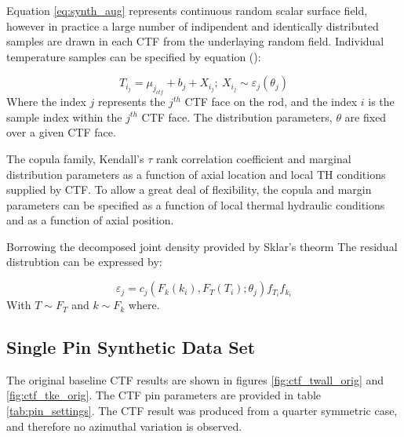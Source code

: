 Equation \ref{eq:synth_aug} represents continuous random scalar surface field, however in practice a large number of indipendent and identically distributed samples are drawn in each CTF from the underlaying random field.  Individual temperature samples can be specified by equation ():

\begin{equation}
    T_{i_j} = \mu_{j_{ctf}} + b_j + X_{i_j};  \ X_{i_j} \sim \varepsilon_j(\theta_j)
    \label{eq:synth_aug_discrete}
\end{equation}
Where the index $j$ represents the $j^{th}$ CTF face on the rod, and the index $i$ is the sample index within the $j^{th}$ CTF face.  The distribution parameters, $\theta$ are fixed over a given CTF face.

The copula family, Kendall's $\tau$ rank correlation coefficient and marginal distribution parameters as a function of axial location and local TH conditions supplied by CTF.
To allow a great deal of flexibility, the copula and margin parameters can be specified as a function of local thermal hydraulic conditions and as a function of axial position.

Borrowing the decomposed joint density provided by Sklar's theorm The residual distrubtion can be expressed by:

\begin{equation}
    \varepsilon_j = c_j(F_k(k_i), F_T(T_i); \theta_j) f_{T_i} f_{k_i}
\end{equation}
With $T \sim F_T$ and $k \sim F_k$ where.

\subsection{Single Pin Synthetic Data Set}

The original baseline CTF results are shown in figures \ref{fig:ctf_twall_orig} and \ref{fig:ctf_tke_orig}.  The CTF pin parameters are provided in table \ref{tab:pin_settings}.  The CTF result was produced from a quarter symmetric case, and therefore no azimuthal variation is observed.


